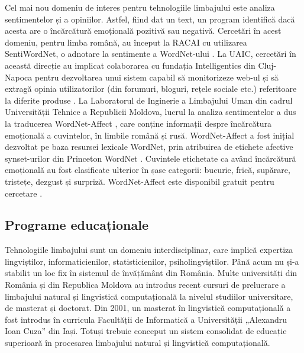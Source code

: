 \begin{multicols}{2}
Cel mai nou domeniu de interes pentru tehnologiile limbajului este analiza sentimentelor și a opiniilor. Astfel, fiind dat un text, un program identifică dacă acesta are o încărcătură emoțională pozitivă sau negativă. Cercetări în acest domeniu, pentru limba română, au început la RACAI cu utilizarea SentiWordNet, o adnotare la sentimente a WordNet-ului \cite{sentiwn}. La UAIC, cercetări în această direcție au implicat colaborarea cu fundația Intelligentics din Cluj-Napoca pentru dezvoltarea unui sistem capabil să monitorizeze web-ul și să extragă opinia utilizatorilor (din forumuri, bloguri, rețele sociale etc.) referitoare la diferite produse \cite{sentimatrix}. La Laboratorul de Inginerie a Limbajului Uman din cadrul Universității Tehnice a Republicii Moldova, lucrul la analiza sentimentelor a dus la traducerea WordNet-Affect \cite{senti_md}, care conține informații despre încărcătura emoțională a cuvintelor, în limbile română și rusă. WordNet-Affect a fost inițial dezvoltat pe baza resursei lexicale WordNet, prin atribuirea de etichete afective synset-urilor din Princeton WordNet \cite{wn-affect}. Cuvintele etichetate ca având încărcătură emoțională au fost clasificate ulterior în șase categorii: bucurie, frică, supărare, tristețe, dezgust și surpriză. WordNet-Affect este disponibil gratuit pentru cercetare \cite{wndom}.

\subsection{Programe educaționale}
Tehnologiile limbajului sunt un domeniu interdisciplinar, care implică expertiza lingviștilor, informaticienilor, statisticienilor, psiholingviștilor. Până acum nu și-a stabilit un loc fix în sistemul de învățământ din România. Multe universități din România și din Republica Moldova au introdus recent cursuri de prelucrare a limbajului natural și lingvistică computațională la nivelul studiilor universitare, de masterat și doctorat. Din 2001, un masterat în lingvistică computațională a fost introdus în curricula Facultății de Informatică a Universității „Alexandru Ioan Cuza” din Iași. Totuși trebuie conceput un sistem consolidat de educație superioară în procesarea limbajului natural și lingvistică computațională.


\end{multicols}
